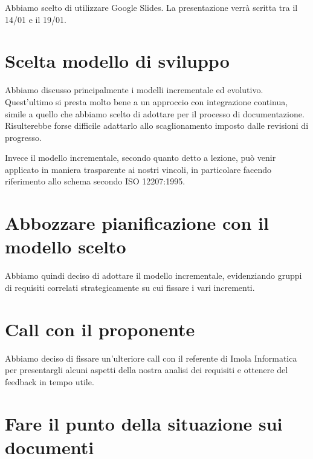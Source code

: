 \documentclass{article}
\begin{document}
Abbiamo scelto di utilizzare Google Slides. La presentazione verrà scritta tra il 14/01 e il 19/01.

\section{Scelta modello di sviluppo}%
\label{sec:scelta_modello_di_sviluppo}

Abbiamo discusso principalmente i modelli incrementale ed evolutivo.
Quest'ultimo si presta molto bene a un approccio con integrazione continua, simile a quello che abbiamo scelto di adottare per il processo di documentazione.
Risulterebbe forse difficile adattarlo allo scaglionamento imposto dalle revisioni di progresso.

Invece il modello incrementale, secondo quanto detto a lezione, può venir applicato in maniera trasparente ai nostri vincoli, in particolare facendo riferimento allo schema secondo ISO 12207:1995.

\section{Abbozzare pianificazione con il modello scelto}%
\label{sec:abbozzare_pianificazione_con_il_modello_scelto}

Abbiamo quindi deciso di adottare il modello incrementale, evidenziando gruppi di requisiti correlati strategicamente su cui fissare i vari incrementi.

\section{Call con il proponente}%
\label{sec:call_con_il_proponente}

Abbiamo deciso di fissare un'ulteriore call con il referente di Imola Informatica per presentargli alcuni aspetti della nostra analisi dei requisiti e ottenere del feedback in tempo utile.

\section{Fare il punto della situazione sui documenti}%
\label{sec:fare_il_punto_della_situazione_sui_documenti}
\end{document}
